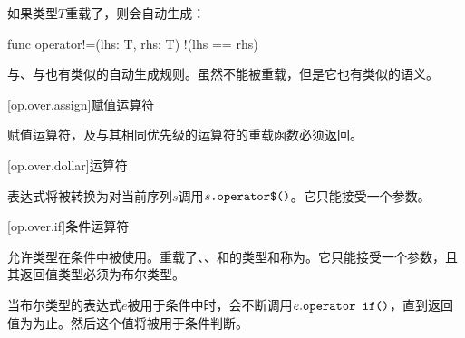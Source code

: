 \pnum
如果类型$T$重载了，则会自动生成：

\begin{codeblock}
func operator!=(lhs: T, rhs: T) { !(lhs == rhs) }
\end{codeblock}

与、与也有类似的自动生成规则。\enternote 虽然不能被重载，但是它也有类似的语义。\exitnote

[op.over.assign]{赋值运算符}

\pnum
赋值运算符，及与其相同优先级的运算符的重载函数必须返回。

[op.over.dollar]{\tcode{\$}运算符}

\pnum
\tcode{\$}表达式将被转换为对当前序列$s$调用$s\texttt{.operator\$()}$。它只能接受一个参数。

[op.over.if]{条件运算符}

\pnum
{}允许类型在条件中被使用。重载了、、和的类型和称为。它只能接受一个参数，且其返回值类型必须为布尔类型。

\pnum
当布尔类型的表达式$e$被用于条件中时，会不断调用$e.\texttt{operator if()}$，直到返回值为为止。然后这个值将被用于条件判断。